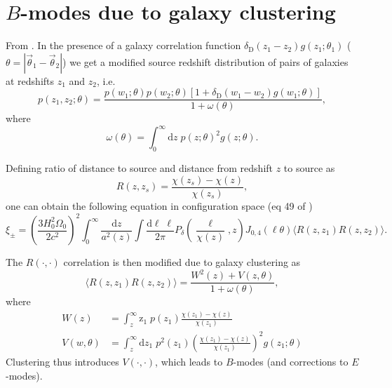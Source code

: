 \documentclass[11pt]{book}
\begin{document}
\section{$B$-modes due to galaxy clustering}
From \cite{Schneider_2002}. In the presence of a galaxy correlation function $\delta_{\mathrm D}(z_1-z_2)g(z_1;\theta_1)$ ($\theta = |\vec\theta_1-\vec\theta_2|$) we get a modified source redshift distribution of pairs of galaxies at redshifts $z_1$ and $z_2$, i.e.
\begin{equation*}
    p(z_1, z_2;\theta) = \frac{p(w_1;\theta)p(w_2;\theta)[1+\delta_{\mathrm D}(w_1-w_2)g(w_1;\theta)]}{1+\omega(\theta)},
\end{equation*}
where
\begin{equation*}
    \omega(\theta) = \int_0^\infty\mathrm d z \; p(z;\theta)^2g(z;\theta).
\end{equation*}

Defining ratio of distance to source and distance from redshift $z$ to source as
\begin{equation*}
    R(z,z_s)=\frac{\chi(z_s)-\chi(z)}{\chi(z_s)},
\end{equation*}
one can obtain the following equation in configuration space (eq 49 of \cite{Schneider_2002})
\begin{equation*}
    \xi_\pm = \left ( \frac{3H_0^2\Omega_0}{2c^2} \right )^2\int_0^\infty \frac{\mathrm d z}{a^2(z)}\int\frac{\mathrm d \ell \; \ell}{2\pi}P_\delta\left ( \frac{\ell}{\chi(z)},z \right ) J_{0,4}(\ell \theta)\langle R(z, z_1)R(z,z_2) \rangle.
\end{equation*}

The $R(\cdot, \cdot)$ correlation is then modified due to galaxy clustering as
\begin{equation*}
    \langle R(z, z_1)R(z,z_2) \rangle = \frac{W^2(z)+V(z,\theta)}{1+\omega(\theta)},
\end{equation*}
where
\begin{align*}
    W(z) &= \int_z^\infty \mathrm z_1 \; p(z_1)\frac{\chi(z_1)-\chi(z)}{\chi(z_1)} \\
    V(w, \theta) &= \int_z^\infty \mathrm d z_1 \; p^2(z_1) \left ( \frac{\chi(z_1)-\chi(z)}{\chi(z_1)} \right )^2 g(z_1; \theta)
\end{align*}
Clustering thus introduces $V(\cdot,\cdot)$, which leads to $B$-modes (and corrections to $E$-modes).
\end{document}
